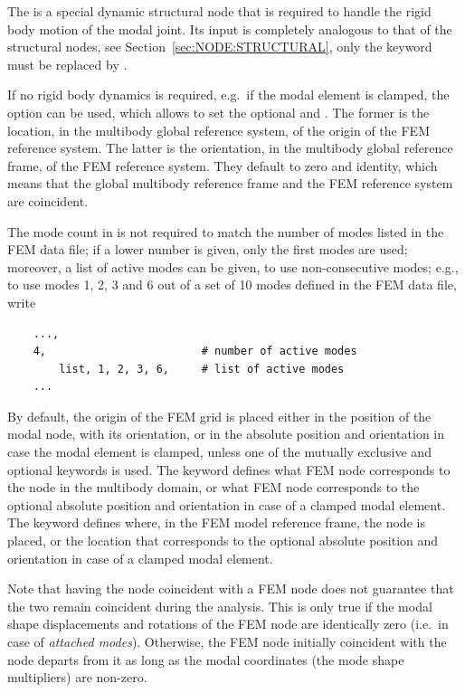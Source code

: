 The  is a special dynamic structural node 
that is required to handle the rigid body motion of the modal joint.
Its input is completely analogous to that of the  structural
nodes, see Section~\ref{sec:NODE:STRUCTURAL}, only the keyword  
must be replaced by .

If no rigid body dynamics is required, e.g.\ if the modal element
is clamped, the  option can be used, which allows
to set the optional 
and .
The former is the location, in the multibody
global reference system, of the origin of the FEM reference system.
The latter is the orientation,
in the multibody global reference frame,
of the FEM reference system.
They default to zero and identity, which means
that the global multibody reference frame
and the FEM reference system are coincident.

The mode count in  is not required to match
the number of modes listed in the FEM data file; if a lower number
is given, only the first  modes are used;
moreover, a list of active modes can be given, to use non-consecutive
modes; e.g., to use modes 1, 2, 3 and 6 out of a set of 10 modes
defined in the FEM data file, write
\begin{verbatim}
    ...,
    4,                        # number of active modes
        list, 1, 2, 3, 6,     # list of active modes
    ...
\end{verbatim}

By default, the origin of the FEM grid is placed either in the position
of the modal node, with its orientation, or in the absolute position 
and orientation in case the modal element is clamped, 
unless one of the mutually exclusive  
and  optional keywords is used.
The  keyword defines what FEM node corresponds 
to the  node in the multibody domain,
or what FEM node corresponds to the optional absolute position 
and orientation in case of a clamped modal element.
The  keyword defines where, in the FEM model
reference frame, the  node is placed, or the location
that corresponds to the optional absolute position and orientation
in case of a clamped modal element.

Note that having the  node coincident with a FEM node
does not guarantee that the two remain coincident during the analysis.
This is only true if the modal shape displacements and rotations of the FEM node
are identically zero (i.e.\ in case of \emph{attached modes}).
Otherwise, the FEM node initially coincident with the  node
departs from it as long as the modal coordinates (the mode shape multipliers) are non-zero.

